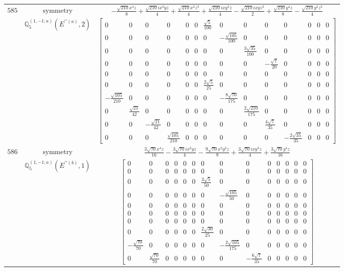 \documentclass[fleqn,8pt,landscape]{jsarticle}
\begin{document}
\begin{longtable}{ccc}
$ 585 $ & $ \text{symmetry} $ & $ - \frac{\sqrt{210} x^{4} z}{8} + \frac{\sqrt{210} i x^{3} y z}{4} + \frac{\sqrt{210} x^{2} z^{3}}{4} + \frac{\sqrt{210} i x y^{3} z}{4} - \frac{\sqrt{210} i x y z^{3}}{2} + \frac{\sqrt{210} y^{4} z}{8} - \frac{\sqrt{210} y^{2} z^{3}}{4} $ \\
$  $ & $ \mathbb{Q}_{5}^{(1,-1;a)}(E^{\prime\prime(a)},2) $ & $ \begin{bmatrix} 0 & 0 & 0 & 0 & 0 & 0 & \frac{\sqrt{5}}{100} & 0 & 0 & 0 & 0 & 0 & 0 & 0 \\ 0 & 0 & 0 & 0 & 0 & 0 & 0 & - \frac{\sqrt{105}}{100} & 0 & 0 & 0 & 0 & 0 & 0 \\ 0 & 0 & 0 & 0 & 0 & 0 & 0 & 0 & \frac{3 \sqrt{35}}{100} & 0 & 0 & 0 & 0 & 0 \\ 0 & 0 & 0 & 0 & 0 & 0 & 0 & 0 & 0 & - \frac{\sqrt{7}}{20} & 0 & 0 & 0 & 0 \\ 0 & 0 & 0 & 0 & 0 & 0 & 0 & 0 & 0 & 0 & 0 & 0 & 0 & 0 \\ 0 & 0 & 0 & 0 & 0 & 0 & \frac{2 \sqrt{5}}{25} & 0 & 0 & 0 & 0 & 0 & 0 & 0 \\ - \frac{\sqrt{105}}{210} & 0 & 0 & 0 & 0 & 0 & 0 & - \frac{8 \sqrt{70}}{175} & 0 & 0 & 0 & 0 & 0 & 0 \\ 0 & \frac{\sqrt{21}}{42} & 0 & 0 & 0 & 0 & 0 & 0 & \frac{2 \sqrt{210}}{175} & 0 & 0 & 0 & 0 & 0 \\ 0 & 0 & - \frac{\sqrt{21}}{42} & 0 & 0 & 0 & 0 & 0 & 0 & \frac{4 \sqrt{7}}{35} & 0 & 0 & 0 & 0 \\ 0 & 0 & 0 & \frac{\sqrt{105}}{210} & 0 & 0 & 0 & 0 & 0 & 0 & - \frac{2 \sqrt{35}}{35} & 0 & 0 & 0 \end{bmatrix} $ \\ \hline
$ 586 $ & $ \text{symmetry} $ & $ \frac{3 \sqrt{70} x^{4} z}{16} - \frac{3 \sqrt{70} i x^{3} y z}{4} - \frac{9 \sqrt{70} x^{2} y^{2} z}{8} + \frac{3 \sqrt{70} i x y^{3} z}{4} + \frac{3 \sqrt{70} y^{4} z}{16} $ \\
$  $ & $ \mathbb{Q}_{5}^{(1,-1;a)}(E^{\prime\prime(b)},1) $ & $ \begin{bmatrix} 0 & 0 & 0 & 0 & 0 & 0 & 0 & 0 & 0 & 0 & 0 & 0 & 0 & 0 \\ 0 & 0 & 0 & 0 & 0 & 0 & 0 & 0 & 0 & 0 & 0 & 0 & 0 & 0 \\ 0 & 0 & 0 & 0 & 0 & 0 & \frac{3 \sqrt{5}}{50} & 0 & 0 & 0 & 0 & 0 & 0 & 0 \\ 0 & 0 & 0 & 0 & 0 & 0 & 0 & - \frac{\sqrt{105}}{50} & 0 & 0 & 0 & 0 & 0 & 0 \\ 0 & 0 & 0 & 0 & 0 & 0 & 0 & 0 & 0 & 0 & 0 & 0 & 0 & 0 \\ 0 & 0 & 0 & 0 & 0 & 0 & 0 & 0 & 0 & 0 & 0 & 0 & 0 & 0 \\ 0 & 0 & 0 & 0 & 0 & 0 & 0 & 0 & 0 & 0 & 0 & 0 & 0 & 0 \\ 0 & 0 & 0 & 0 & 0 & 0 & \frac{2 \sqrt{30}}{25} & 0 & 0 & 0 & 0 & 0 & 0 & 0 \\ - \frac{\sqrt{70}}{70} & 0 & 0 & 0 & 0 & 0 & 0 & - \frac{2 \sqrt{105}}{175} & 0 & 0 & 0 & 0 & 0 & 0 \\ 0 & \frac{\sqrt{70}}{70} & 0 & 0 & 0 & 0 & 0 & 0 & - \frac{6 \sqrt{7}}{35} & 0 & 0 & 0 & 0 & 0 \end{bmatrix} $ \\ \hline

\end{longtable}
\end{document}
